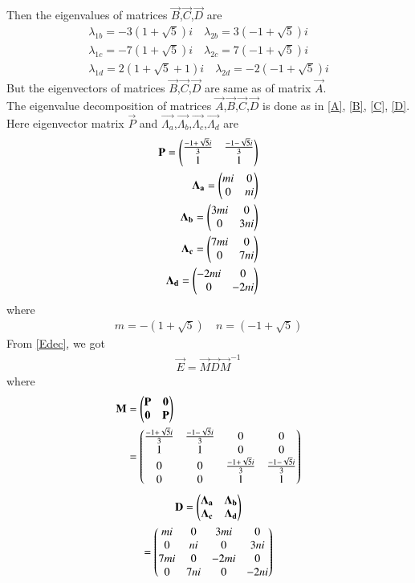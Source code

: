 \documentclass[journal,12pt,twocolumn]{IEEEtran}
\begin{document}
Then the eigenvalues of matrices $\vec{B}$,$\vec{C}$,$\vec{D}$ are
\begin{align}
    \lambda_{1b}=-3(1+\sqrt{5})i\quad\lambda_{2b}=3(-1+\sqrt{5})i\label{eigb}\\
    \lambda_{1c}=-7(1+\sqrt{5})i\quad\lambda_{2c}=7(-1+\sqrt{5})i\label{eigc}\\
    \lambda_{1d}=2(1+\sqrt{5}+1)i\quad\lambda_{2d}=-2(-1+\sqrt{5})i\label{eigd}
\end{align}
But the eigenvectors of matrices $\vec{B}$,$\vec{C}$,$\vec{D}$ are same as of matrix $\vec{A}$.\\
The eigenvalue decomposition of matrices $\vec{A}$,$\vec{B}$,$\vec{C}$,$\vec{D}$ is done as in \eqref{A}, \eqref{B}, \eqref{C}, \eqref{D}. Here eigenvector matrix $\vec{P}$ and $\vec{\Lambda_a}$,$\vec{\Lambda_b}$,$\vec{\Lambda_c}$,$\vec{\Lambda_d}$ are
\begin{align}
    \mathbf{P}=\begin{pmatrix}\frac{-1+\sqrt{5}i}{3}&\frac{-1-\sqrt{5}i}{3}\\1&1\end{pmatrix}\\
    \mathbf{\Lambda_a}=\begin{pmatrix}mi&0\\0&ni\end{pmatrix}\label{exla}\\
    \mathbf{\Lambda_b}=\begin{pmatrix}3mi&0\\0&3ni\end{pmatrix}\label{exlb}\\
    \mathbf{\Lambda_c}=\begin{pmatrix}7mi&0\\0&7ni\end{pmatrix}\label{exlc}\\
    \mathbf{\Lambda_d}=\begin{pmatrix}-2mi&0\\0&-2ni\end{pmatrix}\label{exld}
\end{align}
where
\begin{align}
    m=-(1+\sqrt{5})\quad n=(-1+\sqrt{5})\label{mn}
\end{align}
From \eqref{Edec}, we got
\begin{align}
    \vec{E}=\vec{M}\vec{D}\vec{M}^{-1}
\end{align}
where
\begin{align}
    \mathbf{M}&=\begin{pmatrix}\mathbf{P} & \mathbf{0}\\\mathbf{0} & \mathbf{P}\end{pmatrix}\\
    &=\begin{pmatrix}\frac{-1+\sqrt{5}i}{3}&\frac{-1-\sqrt{5}i}{3}&0&0\\1&1&0&0\\0&0&\frac{-1+\sqrt{5}i}{3}&\frac{-1-\sqrt{5}i}{3}\\0&0&1&1\end{pmatrix}
\end{align}
\begin{multline}
    \mathbf{D}=\begin{pmatrix}\mathbf{\Lambda_a} & \mathbf{\Lambda_b}\\\mathbf{\Lambda_c} & \mathbf{\Lambda_d}\end{pmatrix}\\
    =\begin{pmatrix}mi&0&3mi&0\\0&ni&0&3ni\\7mi&0&-2mi&0\\0&7ni&0&-2ni\end{pmatrix}
\end{multline}
\end{document}

